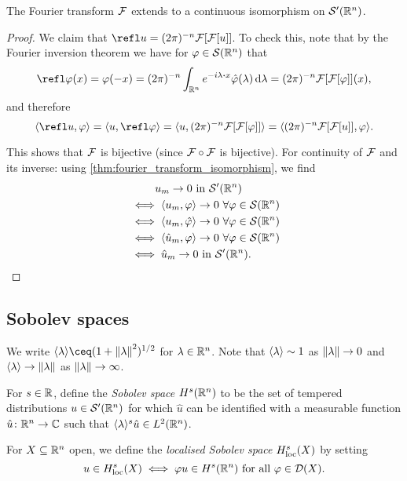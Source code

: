 \begin{theorem}
	The Fourier transform $\mathcal F$ extends to a continuous isomorphism on $\mathcal S'(\mathbb R^n)$. 
\end{theorem}

\begin{proof}
	We claim that $\refl u = (2\pi)^{-n} \FF[\FF[u]]$. To check this, note that by the Fourier inversion theorem we have for $\varphi \in \mathcal S(\mathbb R^n)$ that
	\[
	\refl\phi(x) = \phi(-x) = (2\pi)^{-n} \int_{\RR^n} e^{-i\lambda\vd x} \hat\phi(\lambda) \dd{\lambda} = (2\pi)^{-n} \FF[\FF[\phi]](x),
	\]
	and therefore 
	\[
	\ang{\refl u, \phi} = \ang{u, \refl\phi} = \ang{u, (2\pi)^{-n} \FF[\FF[\phi]]} = \ang{(2\pi)^{-n} \FF[\FF[u]], \phi}. 
	\]
	
	This shows that $\mathcal F$ is bijective (since $\mathcal F\circ \mathcal F$ is bijective). For continuity of $\mathcal F$ and its inverse: using \cref{thm:fourier_transform_isomorphism}, we find
	\begin{align*}
	&\phantom{\iff} u_m \to 0 \text{ in $\mathcal S'(\mathbb R^n)$} \\
	&\iff \langle u_m, \varphi\rangle \to 0 \ \forall \varphi \in \mathcal S(\mathbb R^n) \\
	&\iff \langle u_m, \hat{\varphi}\rangle \to 0 \ \forall \varphi \in \mathcal S(\mathbb R^n) \\
	&\iff \langle\hat u_m, \varphi\rangle \to 0 \ \forall \varphi \in \mathcal S(\mathbb R^n) \\
	&\iff \hat u_m \to 0 \text{ in $\mathcal S'(\mathbb R^n)$}.
	\end{align*}
\end{proof}

\subsection{Sobolev spaces}
\begin{convention}
	We write $\ang{\lambda} \ceq (1 + \norm{\lambda}^2)^{1/2}$ for $\lambda \in \mathbb R^n$. Note that $\langle\lambda\rangle \sim 1$ as $\norm{\lambda} \to 0$ and $\langle\lambda\rangle \to \norm{\lambda}$ as $\norm{\lambda} \to \infty$. 
\end{convention}

\begin{definition}
	For $s \in \mathbb R$, define the \emph{Sobolev space} $H^s(\mathbb R^n)$ to be the set of tempered distributions $u \in \mathcal S'(\mathbb R^n)$ for which $\hat u$ can be identified with a measurable function $\hat u \colon \mathbb R^n \to \mathbb C$ such that $\langle\lambda\rangle^s \hat u \in L^2(\mathbb R^n)$. 
	
	For $X \subseteq \mathbb R^n$ open, we define the \emph{localised Sobolev space} $H^s_\mathrm{loc}(X)$ by setting
	\[
	u \in H^s_\mathrm{loc}(X) \iff \varphi u \in H^s(\mathbb R^n) \text{ for all $\varphi \in \mathcal D(X)$}. 
	\]
\end{definition}

